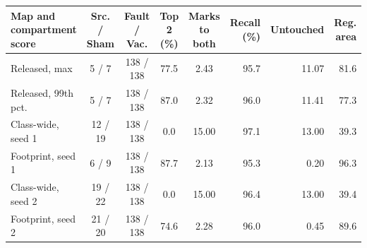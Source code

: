 \begin{tabular}{lccccrrr}
\toprule
Map and compartment score & Src. / Sham & Fault / Vac. & Top 2 (\%) & Marks to both & Recall (\%) & Untouched & Reg. area \\
\midrule
Released, max & 5 / 7 & 138 / 138 & 77.5 & 2.43 & 95.7 & 11.07 & 81.6 \\
Released, 99th pct. & 5 / 7 & 138 / 138 & 87.0 & 2.32 & 96.0 & 11.41 & 77.3 \\
\midrule
Class-wide, seed 1 & 12 / 19 & 138 / 138 & 0.0 & 15.00 & 97.1 & 13.00 & 39.3 \\
Footprint, seed 1 & 6 / 9 & 138 / 138 & 87.7 & 2.13 & 95.3 & 0.20 & 96.3 \\
\midrule
Class-wide, seed 2 & 19 / 22 & 138 / 138 & 0.0 & 15.00 & 96.4 & 13.00 & 39.4 \\
Footprint, seed 2 & 21 / 20 & 138 / 138 & 74.6 & 2.28 & 96.0 & 0.45 & 89.6 \\
\bottomrule
\end{tabular}
